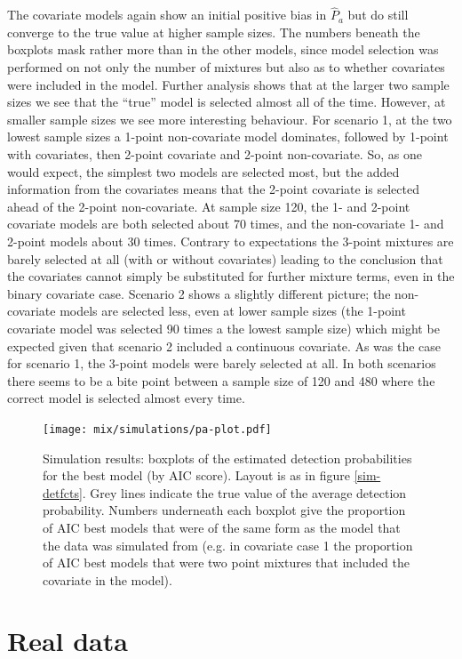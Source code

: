 The covariate models again show an initial positive bias in $\hat{P}_a$ but do still converge to the true value at higher sample sizes. The numbers beneath the boxplots mask rather more than in the other models, since model selection was performed on not only the number of mixtures but also as to whether covariates were included in the model. Further analysis shows that at the larger two sample sizes we see that the ``true'' model is selected almost all of the time. However,  at smaller sample sizes we see more interesting behaviour. For scenario 1, at the two lowest sample sizes a 1-point non-covariate model dominates, followed by 1-point with covariates, then 2-point covariate and 2-point non-covariate. So, as one would expect, the simplest two models are selected most, but the added information from the covariates means that the 2-point covariate is selected ahead of the 2-point non-covariate. At sample size 120, the 1- and 2-point covariate models are both selected about 70 times, and the non-covariate 1- and 2-point models about 30 times. Contrary to expectations the 3-point mixtures are barely selected at all (with or without covariates) leading to the conclusion that the covariates cannot simply be substituted for further mixture terms, even in the binary covariate case. Scenario 2 shows a slightly different picture; the non-covariate models are selected less, even at lower sample sizes (the 1-point covariate model was selected 90 times a the lowest sample size) which might be expected given that scenario 2 included a continuous covariate. As was the case for scenario 1, the 3-point models were barely selected at all. In both scenarios there seems to be a bite point between a sample size of 120 and 480 where the correct model is selected almost every time.
	

\begin{figure}
\centering
\texttt{[image: mix/simulations/pa-plot.pdf]}
\caption{Simulation results: boxplots of the estimated detection probabilities for the best model (by AIC score). Layout is as in figure \ref{sim-detfcts}. Grey lines indicate the true value of the average detection probability. Numbers underneath each boxplot give the proportion of AIC best models that were of the same form as the model that the data was simulated from (e.g. in covariate case 1 the proportion of AIC best models that were two point mixtures that included the covariate in the model).}
\label{sim-boxplots}
\end{figure}


\section{Real data}
\label{s:data}

